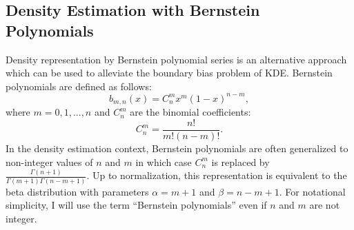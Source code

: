 \documentclass[12pt,titlepage]{article}
\begin{document}
\subsection {Density Estimation with Bernstein Polynomials}
\label{sec:bernstein}

Density representation by Bernstein polynomial series
is an alternative
approach which can be used to alleviate the boundary bias problem of KDE.
Bernstein polynomials are defined as follows:
\begin{equation}
b_{m,n}(x) = C_n^m x^m (1 - x)^{n - m},
\label{eq:bpoly}
\end{equation}
where $m = 0, 1, ..., n$ and $C_n^m$ are the binomial coefficients:
\begin{equation}
C_n^m = \frac{n!}{m! (n-m)!}.
\end{equation}
In the density estimation context, Bernstein polynomials are often
generalized to non-integer values of $n$ and $m$ in which case
$C_n^m$ is replaced by
$\frac{\Gamma(n + 1)}{\Gamma(m + 1) \Gamma(n - m +1)}$. Up to
normalization, this representation is equivalent to the
beta distribution with parameters $\alpha = m + 1$ and $\beta = n - m + 1$.
For notational simplicity, I will use the term ``Bernstein polynomials''
even if $n$ and $m$ are not integer.
\end{document}
